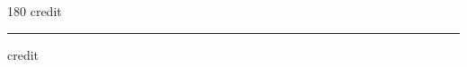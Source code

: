 
\begin{frame}
\begin{center}
\begin{turn}{180}
{\fontsize{2.5cm}{1em}\selectfont credit}
\end{turn}
\vspace{1em}\par  
\hrule
\vspace{1em}\par  
{\fontsize{2.5cm}{1em}\selectfont credit}
\end{center}
\end{frame}
